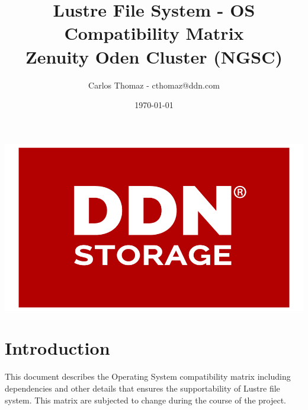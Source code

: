 \documentclass{article}
\title{%
Lustre File System - OS Compatibility Matrix \\
\large Zenuity Oden Cluster (NGSC)}
\author{Carlos Thomaz - cthomaz@ddn.com}
\date{\today}
\begin{document}
\maketitle


\begin{center}
    \includegraphics[scale=0.14]{logo.png}\\[1cm] 
\end{center}

\newpage

\begin{versionhistory}
\end{versionhistory}


\newpage
\section{Introduction}
This document describes the Operating System compatibility matrix including dependencies and other details that ensures the supportability of Lustre file system. This matrix are subjected to change during the course of the project. 
\end{document}
